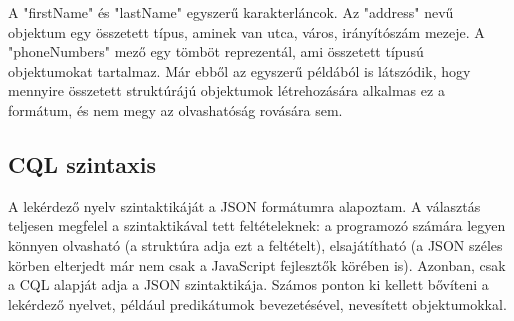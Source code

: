\documentclass[a4paper,12pt]{report}
\begin{document}
A "firstName" és "lastName" egyszerű karakterláncok. Az "address" nevű objektum egy összetett típus, aminek van utca, város, irányítószám mezeje. A "phoneNumbers" mező egy tömböt reprezentál, ami összetett típusú objektumokat tartalmaz. Már ebből az egyszerű példából is látszódik, hogy mennyire összetett struktúrájú objektumok létrehozására alkalmas ez a formátum, és nem megy az olvashatóság rovására sem.
\subsection{CQL szintaxis}
A lekérdező nyelv szintaktikáját a JSON formátumra alapoztam. A választás teljesen megfelel a szintaktikával tett feltételeknek: a programozó számára legyen könnyen olvasható (a struktúra adja ezt a feltételt), elsajátítható (a JSON széles körben elterjedt már nem csak a JavaScript fejlesztők körében is). Azonban, csak a CQL alapját adja a JSON szintaktikája. Számos ponton ki kellett bővíteni a lekérdező nyelvet, például predikátumok bevezetésével, nevesített objektumokkal.
\end{document}
